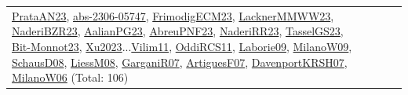 {\begin{longtable}{p{3cm}r>{\raggedright\arraybackslash}p{6cm}>{\raggedright\arraybackslash}p{6cm}>{\raggedright\arraybackslash}p{8cm}}
\hyperref[detail:PrataAN23]{PrataAN23}, \hyperref[detail:abs-2306-05747]{abs-2306-05747}, \hyperref[detail:FrimodigECM23]{FrimodigECM23}, \hyperref[detail:LacknerMMWW23]{LacknerMMWW23}, \hyperref[detail:NaderiBZR23]{NaderiBZR23}, \hyperref[detail:AalianPG23]{AalianPG23}, \hyperref[detail:AbreuPNF23]{AbreuPNF23}, \hyperref[detail:NaderiRR23]{NaderiRR23}, \hyperref[detail:TasselGS23]{TasselGS23}, \hyperref[detail:Bit-Monnot23]{Bit-Monnot23}, \hyperref[detail:Xu2023]{Xu2023}...\hyperref[detail:Vilim11]{Vilim11}, \hyperref[detail:OddiRCS11]{OddiRCS11}, \hyperref[detail:Laborie09]{Laborie09}, \hyperref[detail:MilanoW09]{MilanoW09}, \hyperref[detail:SchausD08]{SchausD08}, \hyperref[detail:LiessM08]{LiessM08}, \hyperref[detail:GarganiR07]{GarganiR07}, \hyperref[detail:ArtiguesF07]{ArtiguesF07}, \hyperref[detail:DavenportKRSH07]{DavenportKRSH07}, \hyperref[detail:MilanoW06]{MilanoW06} (Total: 106)\\

\end{longtable}}
